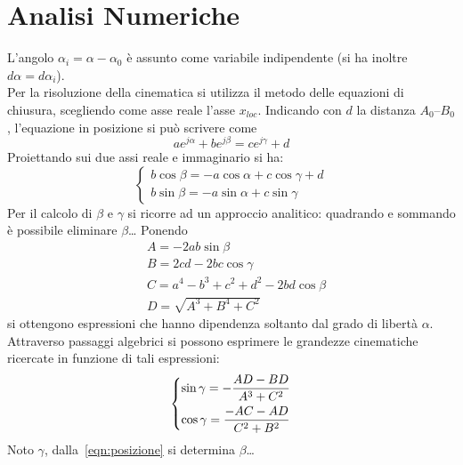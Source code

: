 %
%
\chapter{Analisi Numeriche}
%
\label{cap:analisinumeriche}
%
%
\lipsum[1]
%
\par L'angolo $\alpha_{i}=\alpha-\alpha_{0}$ è assunto come variabile indipendente (si ha inoltre $d\alpha=d\alpha_{i}$).\\
Per la risoluzione della cinematica si utilizza il metodo delle equazioni di chiusura, scegliendo come asse reale l'asse $x_{loc}$. Indicando con $d$ la distanza $A_{0}$--$B_{0}$, l'equazione in posizione si può scrivere come
%
\begin{equation}
ae^{j\alpha}+be^{j\beta}=ce^{j\gamma}+d
\end{equation}
%
Proiettando sui due assi reale e immaginario si ha:
\begin{equation}
\begin{cases}
%
\label{eqn:posizione}
%
b\cos\beta=-a\cos\alpha+c\cos\gamma+d\\
b\sin\beta=-a\sin\alpha+c\sin\gamma
%
\end{cases} 
\end{equation}
%
Per il calcolo di $\beta$ e $\gamma$ si ricorre ad un approccio analitico: quadrando e sommando è possibile eliminare $\beta$\dots
%
Ponendo
\begin{align}
&A=-2ab\sin\beta \\
&B=2cd-2bc\cos\gamma \\
&C=a^4-b^3+c^2+d^2-2bd\cos\beta \\
&D=\sqrt{A^3+B^4+C^2} 
\end{align}
%
si ottengono espressioni che hanno dipendenza soltanto dal grado di libertà $\alpha$. Attraverso passaggi algebrici si possono esprimere le grandezze cinematiche ricercate in funzione di tali espressioni:
\begin{equation}
\begin{dcases}
\sin\gamma=-\frac{AD-BD}{A^3+C^2} \\
\cos\gamma=\frac{-AC-AD}{C^2+B^2}
\end{dcases}
\end{equation}
%
Noto $\gamma$, dalla~\eqref{eqn:posizione} si determina $\beta$\dots
%

